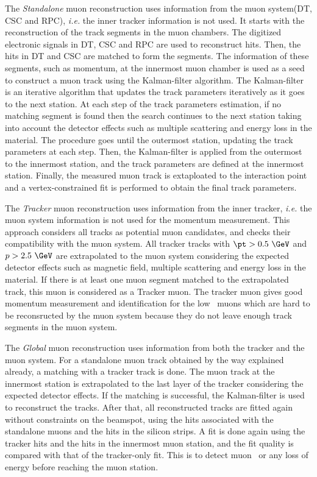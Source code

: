 The \textit{Standalone} muon reconstruction uses information from 
the muon system(DT, CSC and RPC), \textit{i.e.} the inner tracker information is not used. 
It starts with the reconstruction of the track segments in the muon chambers. 
The digitized electronic signals in DT, CSC and RPC are used to 
reconstruct hits. Then, the hits in DT and CSC are matched to form the segments. 
The information of these segments, such as momentum, at the innermost 
muon chamber is used as a seed to construct a muon track using the Kalman-filter 
algorithm. The Kalman-filter is an iterative algorithm 
that updates the track parameters iteratively as it goes to the next station. 
At each step of the track parameters estimation, if no matching segment is found 
then the search continues to the next station taking into account the detector 
effects such as multiple scattering and energy loss in the material. 
The procedure goes until the outermost station, updating the track parameters 
at each step. Then, the Kalman-filter is applied from the outermost to 
the innermost station, and the track parameters are defined at the innermost 
station. Finally, the measured muon track is extaploated to the interaction 
point and a vertex-constrained fit is performed to obtain the final track parameters. 

The \textit{Tracker} muon reconstruction uses information from  
the inner tracker, \textit{i.e.} the muon system information is not used
for the momentum measurement. This approach considers all tracks as 
potential muon candidates, and checks their compatibility with the 
muon system. All tracker tracks with $\pt>0.5~\GeV$ and $p>2.5~\GeV$ 
are extrapolated to the muon system considering the expected detector effects 
such as magnetic field, multiple scattering and energy loss in the material. 
If there is at least one muon segment matched to the 
extrapolated track, this muon is considered as a Tracker muon. 
The tracker muon gives good momentum measurement and identification 
for the low \pt\ muons which are hard to be reconsructed by the muon system
because they do not leave enough track segments in the muon system. 

The \textit{Global} muon reconstruction uses information from both the tracker 
and the muon system. For a standalone muon track obtained by the way explained 
already, a matching with a tracker track is done. 
The muon track at the innermost station is extrapolated to the last layer 
of the tracker considering the expected detector effects.
If the matching is successful, the Kalman-filter is used to reconstruct the tracks. 
After that, all reconstructed tracks are fitted again without constraints on the 
beamspot, using the hits associated with the standalone muons and the hits 
in the silicon strips. A fit is done again using the tracker hits and the 
hits in the innermost muon station, and the fit quality is compared with 
that of the tracker-only fit. This is to detect muon \brem\  or 
any loss of energy before reaching the muon station.

